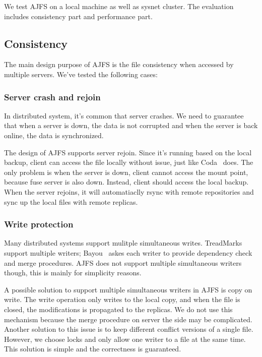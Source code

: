 We test AJFS on a local machine as well as sysnet cluster. The evaluation includes consistency part and performance part.

\subsection{Consistency}

The main design purpose of AJFS is the file consistency when accessed by multiple servers. We've tested the following cases:

\subsubsection{Server crash and rejoin}

In distributed system, it's common that server crashes. We need to guarantee that when a server is down, the data is not corrupted and when the server is back online, the data is synchronized.

The design of AJFS supports server rejoin. Since it's running based on the local backup, client can access the file locally without issue, just like Coda~\cite{KS92} does.
The only problem is when the server is down, client cannot access the mount point, because fuse server is also down. Instead, client should access the local backup. When the server rejoins, it will automatiaclly rsync with remote repositories and sync up the local files with remote replicas.

\subsubsection{Write protection}

Many distributed systems support mulitple simultaneous writes. TreadMarks~\cite{treadmarks} support multiple writers; Bayou~\cite{bayou} askes each writer to provide dependency check and merge procedures. AJFS does not support multiple simultaneous writers though, this is mainly for simplicity reasons. 

A possible solution to support multiple simultaneous writers in AJFS is copy on write. The write operation only writes to the local copy, and when the file is closed, the modifications is propagated to the replicas. We do not use this mechanism because the merge procedure on server the side may be complicated. Another solution to this issue is to keep different conflict versions of a single file. 
However, we choose locks and only allow one writer to a file at the same time. This solution is simple and the correctness is guaranteed.

